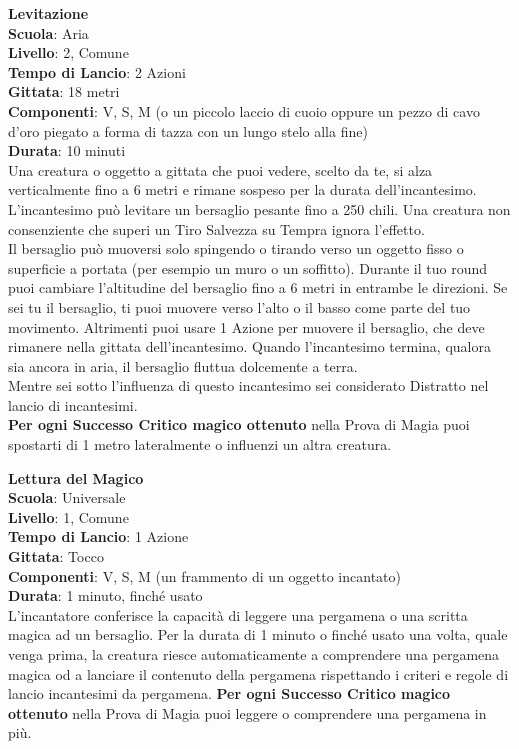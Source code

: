 \begin{multicols}{2}
\medskip\textbf{Levitazione}\\
\textbf{Scuola}: Aria\\
\textbf{Livello}: 2, Comune\\
\textbf{Tempo di Lancio}: 2 Azioni\\
\textbf{Gittata}: 18 metri\\
\textbf{Componenti}: V, S, M (o un piccolo laccio di cuoio oppure un pezzo di cavo d'oro piegato a forma di tazza con un lungo stelo alla fine)\\
\textbf{Durata}: 10 minuti \\
Una creatura o oggetto a gittata che puoi vedere, scelto da te, si alza verticalmente fino a 6 metri e rimane sospeso per la durata dell'incantesimo. L'incantesimo può levitare un bersaglio pesante fino a 250 chili. Una creatura non consenziente che superi un Tiro Salvezza su Tempra ignora l'effetto.\\
Il bersaglio può muoversi solo spingendo o tirando verso un oggetto fisso o superficie a portata (per esempio un muro o un soffitto). Durante il tuo round puoi cambiare l'altitudine del bersaglio fino a 6 metri in entrambe le direzioni. Se sei tu il bersaglio, ti puoi muovere verso l'alto o il basso come parte del tuo movimento. Altrimenti puoi usare 1 Azione per muovere il bersaglio, che deve rimanere nella gittata dell'incantesimo. Quando l'incantesimo termina, qualora sia ancora in aria, il bersaglio fluttua dolcemente a terra.\\
Mentre sei sotto l'influenza di questo incantesimo sei considerato Distratto nel lancio di incantesimi.\\
\textbf{Per ogni Successo Critico magico ottenuto} nella Prova di Magia puoi spostarti di 1 metro lateralmente o influenzi un altra creatura.

\medskip\textbf{Lettura del Magico}\\
\textbf{Scuola}: Universale\\
\textbf{Livello}: 1, Comune\\
\textbf{Tempo di Lancio}: 1 Azione\\
\textbf{Gittata}: Tocco\\
\textbf{Componenti}: V, S, M (un frammento di un oggetto incantato)\\
\textbf{Durata}: 1 minuto, finché usato\\
L'incantatore conferisce la capacità di leggere una pergamena o una scritta magica ad un bersaglio. Per la durata di 1 minuto o finché usato una volta, quale venga prima, la creatura riesce automaticamente a comprendere una pergamena magica od a lanciare il contenuto della pergamena rispettando i criteri e regole di lancio incantesimi da pergamena.
\textbf{Per ogni Successo Critico magico ottenuto} nella Prova di Magia puoi leggere o comprendere una pergamena in più.


\end{multicols}

